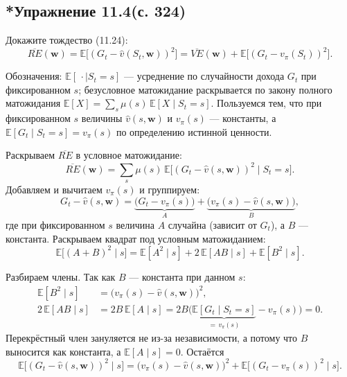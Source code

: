 \subsection{*Упражнение 11.4(с. 324)}
Докажите тождество (11.24):
\begin{equation}
    \overline{RE}(\mathbf w) = \mathbb E\big[(G_t - \hat v(S_t,\mathbf w))^2\big]
    = \overline{VE}(\mathbf w) + \mathbb E\big[(G_t - v_\pi(S_t))^2\big].
    \tag{11.24}
\end{equation}

\begin{solution}
    Обозначения: $\mathbb E[\,\cdot\mid S_t=s]$ --- усреднение по случайности дохода
    $G_t$ при фиксированном $s$; безусловное матожидание раскрывается по закону
    полного матожидания $\mathbb E[X]=\sum_s\mu(s)\,\mathbb E[X\mid S_t=s]$.
    Пользуемся тем, что при фиксированном $s$ величины $\hat v(s,\mathbf w)$ и
    $v_\pi(s)$ --- константы, а $\mathbb E[G_t\mid S_t=s]=v_\pi(s)$ по определению
    истинной ценности.

    Раскрываем $\overline{RE}$ в условное матожидание:
    \begin{equation*}
        \overline{RE}(\mathbf w) = \sum_s \mu(s)\,
        \mathbb E\big[(G_t - \hat v(s,\mathbf w))^2 \mid S_t=s\big].
    \end{equation*}
    Добавляем и вычитаем $v_\pi(s)$ и группируем:
    \begin{equation*}
        G_t - \hat v(s,\mathbf w) = \underbrace{\big(G_t - v_\pi(s)\big)}_{A}
        + \underbrace{\big(v_\pi(s) - \hat v(s,\mathbf w)\big)}_{B},
    \end{equation*}
    где при фиксированном $s$ величина $A$ случайна (зависит от $G_t$), а $B$ ---
    константа. Раскрываем квадрат под условным матожиданием:
    \begin{equation*}
        \mathbb E\big[(A+B)^2 \mid s\big]
        = \mathbb E[A^2\mid s] + 2\,\mathbb E[AB\mid s] + \mathbb E[B^2\mid s].
    \end{equation*}

    Разбираем члены. Так как $B$ --- константа при данном $s$:
    \begin{align*}
        \mathbb E[B^2\mid s] &= \big(v_\pi(s) - \hat v(s,\mathbf w)\big)^2,\\
        2\,\mathbb E[AB\mid s] &= 2B\,\mathbb E[A\mid s]
        = 2B\big(\underbrace{\mathbb E[G_t\mid S_t=s]}_{=\,v_\pi(s)} - v_\pi(s)\big) = 0.
    \end{align*}
    Перекрёстный член зануляется не из-за независимости, а потому что $B$
    выносится как константа, а $\mathbb E[A\mid s]=0$. Остаётся
    \begin{equation*}
        \mathbb E\big[(G_t - \hat v(s,\mathbf w))^2 \mid s\big]
        = \big(v_\pi(s) - \hat v(s,\mathbf w)\big)^2
        + \mathbb E\big[(G_t - v_\pi(s))^2 \mid s\big].
    \end{equation*}


\end{solution}
